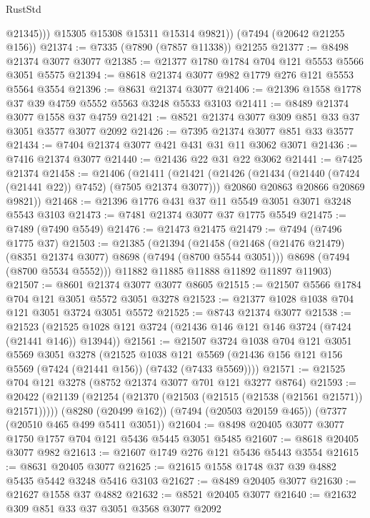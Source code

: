 \begin{lexlean}{RustStd}
\begin{coremodule}
              @21345)))
        @15305
        @15308
        @15311
        @15314
        @9821))
    (@7494 (@20642 @21255 @156))
@21374 := @7335 (@7890 (@7857 @11338)) @21255
@21377 := @8498 @21374 @3077 @3077
@21385 := @21377 @1780 @1784 @704 @121 @5553 @5566 @3051 @5575
@21394 := @8618 @21374 @3077 @982 @1779 @276 @121 @5553 @5564 @3554
@21396 := @8631 @21374 @3077
@21406 := @21396 @1558 @1778 @37 @39 @4759 @5552 @5563 @3248 @5533 @3103
@21411 := @8489 @21374 @3077 @1558 @37 @4759
@21421 := @8521 @21374 @3077 @309 @851 @33 @37 @3051 @3577 @3077 @2092
@21426 := @7395 @21374 @3077 @851 @33 @3577
@21434 := @7404 @21374 @3077 @421 @431 @31 @11 @3062 @3071
@21436 := @7416 @21374 @3077
@21440 := @21436 @22 @31 @22 @3062
@21441 := @7425 @21374
@21458 := @21406
    (@21411
      (@21421
        (@21426 (@21434 (@21440 (@7424 (@21441 @22)) @7452) (@7505 @21374 @3077)))
        @20860
        @20863
        @20866
        @20869
        @9821))
@21468 := @21396 @1776 @431 @37 @11 @5549 @3051 @3071 @3248 @5543 @3103
@21473 := @7481 @21374 @3077 @37 @1775 @5549
@21475 := @7489 (@7490 @5549)
@21476 := @21473 @21475
@21479 := @7494 (@7496 @1775 @37)
@21503 := @21385
    (@21394
      (@21458
        (@21468 (@21476 @21479) (@8351 @21374 @3077) @8698 (@7494 (@8700 @5544 @3051)))
        @8698
        (@7494 (@8700 @5534 @5552)))
      @11882
      @11885
      @11888
      @11892
      @11897
      @11903)
@21507 := @8601 @21374 @3077 @3077 @8605
@21515 := @21507 @5566 @1784 @704 @121 @3051 @5572 @3051 @3278
@21523 := @21377 @1028 @1038 @704 @121 @3051 @3724 @3051 @5572
@21525 := @8743 @21374 @3077
@21538 := @21523
    (@21525 @1028 @121 @3724 (@21436 @146 @121 @146 @3724 (@7424 (@21441 @146)) @13944))
@21561 := @21507
    @3724
    @1038
    @704
    @121
    @3051
    @5569
    @3051
    @3278
    (@21525
      @1038
      @121
      @5569
      (@21436 @156 @121 @156 @5569 (@7424 (@21441 @156)) (@7432 (@7433 @5569))))
@21571 := @21525 @704 @121 @3278 (@8752 @21374 @3077 @701 @121 @3277 @8764)
@21593 := @20422
    (@21139 (@21254 (@21370 (@21503 (@21515 (@21538 (@21561 @21571)) @21571)))))
    (@8280 (@20499 @162))
    (@7494 (@20503 @20159 @465))
    (@7377 (@20510 @465 @499 @5411 @3051))
@21604 := @8498 @20405 @3077 @3077 @1750 @1757 @704 @121 @5436 @5445 @3051 @5485
@21607 := @8618 @20405 @3077 @982
@21613 := @21607 @1749 @276 @121 @5436 @5443 @3554
@21615 := @8631 @20405 @3077
@21625 := @21615 @1558 @1748 @37 @39 @4882 @5435 @5442 @3248 @5416 @3103
@21627 := @8489 @20405 @3077
@21630 := @21627 @1558 @37 @4882
@21632 := @8521 @20405 @3077
@21640 := @21632 @309 @851 @33 @37 @3051 @3568 @3077 @2092

\end{coremodule}
\end{lexlean}
